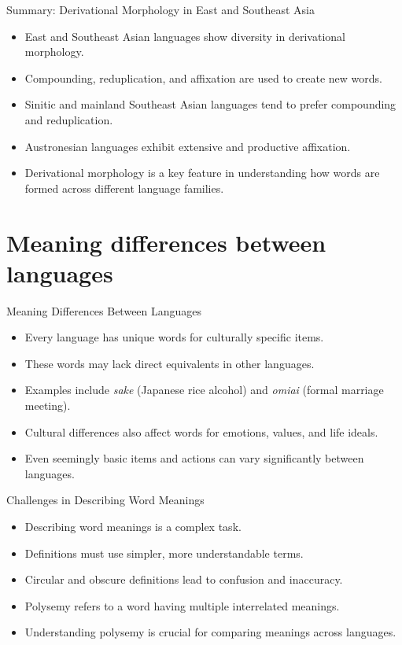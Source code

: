 \documentclass{beamer}
\begin{document}
\begin{frame}{Summary: Derivational Morphology in East and Southeast Asia}
    \begin{itemize}
        \item East and Southeast Asian languages show diversity in derivational morphology.
        \item Compounding, reduplication, and affixation are used to create new words.
        \item Sinitic and mainland Southeast Asian languages tend to prefer compounding and reduplication.
        \item Austronesian languages exhibit extensive and productive affixation.
        \item Derivational morphology is a key feature in understanding how words are formed across different language families.
    \end{itemize}
\end{frame}

\section{Meaning differences between languages}

\begin{frame}{Meaning Differences Between Languages}
    \begin{itemize}
        \item Every language has unique words for culturally specific items.
        \item These words may lack direct equivalents in other languages.
        \item Examples include \textit{sake} (Japanese rice alcohol) and \textit{omiai} (formal marriage meeting).
        \item Cultural differences also affect words for emotions, values, and life ideals.
        \item Even seemingly basic items and actions can vary significantly between languages.
    \end{itemize}
\end{frame}

\begin{frame}{Challenges in Describing Word Meanings}
    \begin{itemize}
        \item Describing word meanings is a complex task.
        \item Definitions must use simpler, more understandable terms.
        \item Circular and obscure definitions lead to confusion and inaccuracy.
        \item Polysemy refers to a word having multiple interrelated meanings.
        \item Understanding polysemy is crucial for comparing meanings across languages.
    \end{itemize}
\end{frame}
\end{document}
